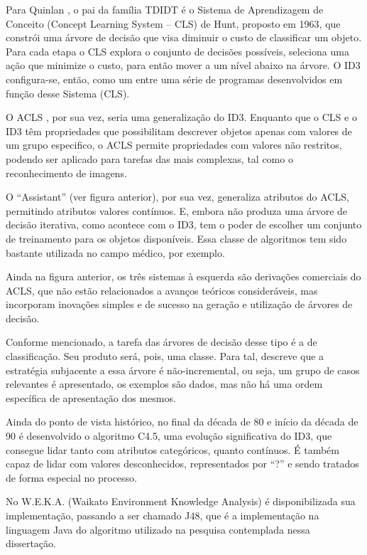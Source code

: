 Para Quinlan \cite{Quinlan86inductionof}, o pai da família TDIDT é o Sistema de Aprendizagem de Conceito (Concept Learning System – CLS) de Hunt, proposto em 1963, que constrói uma árvore de decisão que visa diminuir o custo de classificar um objeto. Para cada etapa o CLS explora o conjunto de decisões possíveis, seleciona uma ação que minimize o custo, para então mover a um nível abaixo na árvore. O ID3 configura-se, então, como um entre uma série de programas desenvolvidos em função desse Sistema (CLS).

O ACLS \cite{Quinlan86inductionof}, por sua vez, seria uma generalização do ID3. Enquanto que o CLS e o ID3 têm propriedades que possibilitam descrever objetos apenas com valores de um grupo especifico, o ACLS permite propriedades com valores não restritos, podendo ser aplicado para tarefas das mais complexas, tal como o reconhecimento de imagens.

O “Assistant” (ver figura anterior), por sua vez, generaliza atributos do ACLS, permitindo atributos valores contínuos. E, embora não produza uma árvore de decisão iterativa, como acontece com o ID3, tem o poder de escolher um conjunto de treinamento para os objetos disponíveis. Essa classe de algoritmos tem sido bastante utilizada no campo médico, por exemplo.


Ainda na figura anterior, os três sistemas à esquerda são derivações comerciais do ACLS, que não estão relacionados a avanços teóricos consideráveis, mas incorporam inovações simples e de sucesso na geração e utilização de árvores de decisão.

Conforme mencionado, a tarefa das árvores de decisão desse tipo é a de classificação.  Seu produto será, pois, uma classe. Para tal, \cite{Quinlan86inductionof} descreve que a estratégia subjacente a essa árvore é não-incremental, ou seja, um grupo de casos relevantes é apresentado, os exemplos são dados, mas não há uma ordem específica de apresentação dos mesmos. 

Ainda do ponto de vista histórico, no final da década de 80 e início da década de 90 \cite{Kohavi99decisiontree} é desenvolvido o algoritmo C4.5, uma evolução significativa do ID3, que consegue lidar tanto com atributos categóricos, quanto contínuos. É também capaz de lidar com valores desconhecidos, representados por “?” e sendo tratados de forma especial no processo.

No W.E.K.A. (Waikato Environment Knowledge Analysis) é disponibilizada sua implementação, passando a ser chamado J48, que é a implementação na linguagem Java do algoritmo utilizado na pesquisa contemplada nessa dissertação.

